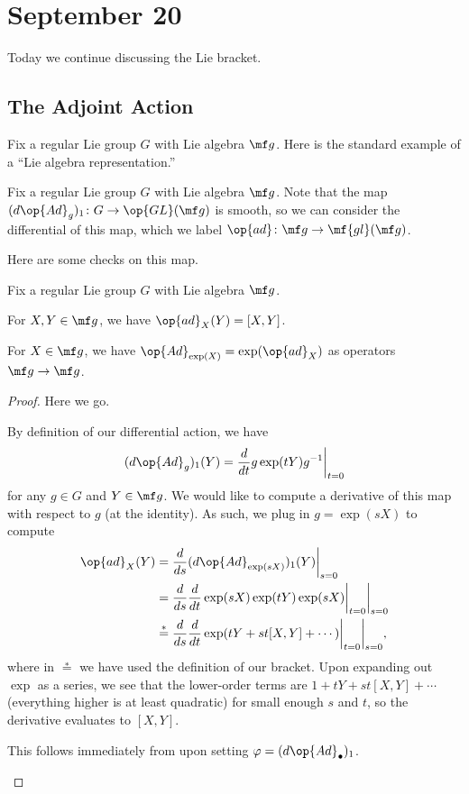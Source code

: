 \documentclass[../notes.tex]{subfiles}
\begin{document}
\section{September 20}
Today we continue discussing the Lie bracket.

\subsection{The Adjoint Action}
Fix a regular Lie group $G$ with Lie algebra $\mf g$. Here is the standard example of a ``Lie algebra representation.''
\begin{notation}
	Fix a regular Lie group $G$ with Lie algebra $\mf g$. Note that the map $(d{\op{Ad}_g})_1\colon G\to\op{GL}(\mf g)$ is smooth, so we can consider the differential of this map, which we label $\op{ad}\colon\mf g\to\mf{gl}(\mf g)$.
\end{notation}
Here are some checks on this map.
\begin{proposition} \label{prop:commutator-by-adjoint}
	Fix a regular Lie group $G$ with Lie algebra $\mf g$.
	\begin{listalph}
		\item For $X,Y\in\mf g$, we have $\op{ad}_X(Y)=[X,Y]$.
		\item For $X\in\mf g$, we have ${\op{Ad}_{\exp(X)}}=\exp({\op{ad}_X})$ as operators $\mf g\to\mf g$.
	\end{listalph}
\end{proposition}
\begin{proof}
	Here we go.
	\begin{listalph}
		\item By definition of our differential action, we have
		\[(d{\op{Ad}_g})_1(Y)=\frac d{dt}g\exp(tY)g^{-1}\bigg|_{t=0}\]
		for any $g\in G$ and $Y\in\mf g$. We would like to compute a derivative of this map with respect to $g$ (at the identity). As such, we plug in $g=\exp(sX)$ to compute
		\begin{align*}
			\op{ad}_X(Y) &= \frac d{ds}(d{\op{Ad}_{\exp(sX)}})_1(Y)\bigg|_{s=0} \\
			&= \frac d{ds}\frac d{dt}\exp(sX)\exp(tY)\exp(sX)\bigg|_{t=0}\bigg|_{s=0} \\
			&\stackrel*= \frac d{ds}\frac d{dt}\exp(tY+st[X,Y]+\cdots)\bigg|_{t=0}\bigg|_{s=0},
		\end{align*}
		where in $\stackrel*=$ we have used the definition of our bracket. Upon expanding out $\exp$ as a series, we see that the lower-order terms are $1+tY+st[X,Y]+\cdots$ (everything higher is at least quadratic) for small enough $s$ and $t$, so the derivative evaluates to $[X,Y]$.
		\item This follows immediately from  upon setting $\varphi=(d{\op{Ad}_\bullet})_1$.
		\qedhere
	\end{listalph}
\end{proof}
\end{document}
